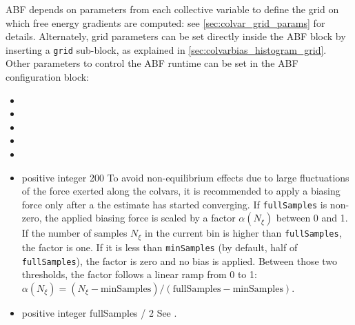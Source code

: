 
ABF depends on parameters from each collective variable to define the grid on which free energy gradients are computed: see \ref{sec:colvar_grid_params} for details.
Alternately, grid parameters can be set directly inside the ABF block by inserting a \texttt{grid} sub-block, as explained in \ref{sec:colvarbias_histogram_grid}.
Other parameters to control the ABF runtime can be set in the ABF configuration block:

\begin{itemize}

\item {}
\item {}
\item {}
\item {}
\item {}

\item %
  {positive integer}
  {200}
  {To avoid non-equilibrium effects due to large fluctuations of the force exerted along the
   colvars, it is recommended to apply a biasing force only after a the estimate has started
   converging. If \texttt{fullSamples} is non-zero, the applied biasing force is scaled by a factor
   $\alpha(N_\xi)$ between 0 and 1.
   If the number of samples $N_\xi$ in the current bin is higher than \texttt{fullSamples},
   the factor is one. If it is less than \texttt{minSamples} (by default, half of \texttt{fullSamples}),
   the factor is zero and no bias is applied.
   Between those two thresholds, the factor follows a linear ramp from
   0 to 1: $\alpha(N_\xi) = (N_\xi - \mathrm{minSamples}) / (\mathrm{fullSamples} - \mathrm{minSamples})$.}


\item {}
 {positive integer}
 {fullSamples / 2}
 {See .}



\end{itemize}
